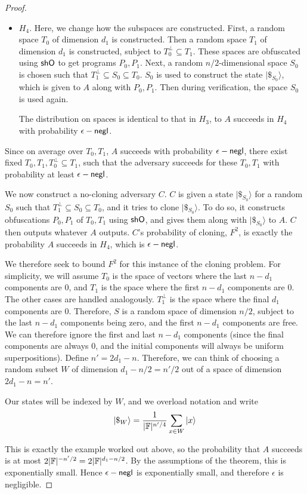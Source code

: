 \begin{proof}
\begin{itemize}
	\item $H_4$.  Here, we change how the subspaces are constructed.  First, a random space $T_0$ of dimension $d_1$ is constructed.  Then a random space $T_1$ of dimension $d_1$ is constructed, subject to $T_0^\bot\subseteq T_1$.  These spaces are obfuscated using ${\sf shO}$ to get programs $P_0,P_1$.  Next, a random $n/2$-dimensional space $S_0$ is chosen such that $T_1^\bot\subseteq S_0\subseteq T_0$.  $S_0$ is used to construct the state $|\$_{S_0}\rangle$, which is given to $A$ along with $P_0,P_1$.  Then during verification, the space $S_0$ is used again.
	
	The distribution on spaces is identical to that in $H_3$, to $A$ succeeds in $H_4$ with probability $\epsilon-{\sf negl}$.  
\end{itemize}

Since on average over $T_0,T_1$, $A$ succeeds with probability $\epsilon-{\sf negl}$, there exist fixed $T_0,T_1, T_0^\bot\subseteq T_1$, such that the adversary succeeds for these $T_0,T_1$ with probability at least $\epsilon-{\sf negl}$.

We now construct a no-cloning adversary $C$.  $C$ is given a state $|\$_{S_0}\rangle$ for a random $S_0$ such that $T_1^\bot\subseteq S_0\subseteq T_0$, and it tries to clone $|\$_{S_0}\rangle$.  To do so, it constructs obfuscations $P_0,P_1$ of $T_0,T_1$ using ${\sf shO}$, and gives them along with $|\$_{S_0}\rangle$ to $A$.  $C$ then outputs whatever $A$ outputs.  $C$'s probability of cloning, $F^2$, is exactly the probability $A$ succeeds in $H_4$, which is $\epsilon-{\sf negl}$.

We therefore seek to bound $F^2$ for this instance of the cloning problem.  For simplicity, we will assume $T_0$ is the space of vectors where the last $n-d_1$ components are 0, and $T_1$ is the space where the first $n-d_1$ components are 0.  The other cases are handled analogously.  $T_1^\bot$ is the space where the final $d_1$ components are 0.  Therefore, $S$ is a random space of dimension $n/2$, subject to the last $n-d_1$ components being zero, and the first $n-d_1$ components are free.  We can therefore ignore the first and last $n-d_1$ components (since the final components are always 0, and the initial components will always be uniform superpositions).  Define $n'=2d_1-n$.  Therefore, we can think of choosing a random subset $W$ of dimension $d_1-n/2=n'/2$ out of a space of dimension $2d_1-n=n'$.   

Our states will be indexed by $W$, and we overload notation and write \[|\$_{W}\rangle=\frac{1}{|{\mathbb F}|^{n'/4}}\sum_{x\in W}|x\rangle\]

This is exactly the example worked out above, so the probability that $A$ succeeds is at most $2|{\mathbb F}|^{-n'/2}=2|{\mathbb F}|^{d_1-n/2}$.  By the assumptions of the theorem, this is exponentially small.  Hence $\epsilon-{\sf negl}$ is exponentially small, and therefore $\epsilon$ is negligible.\end{proof}


